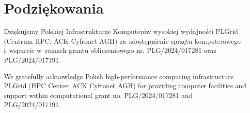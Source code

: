\documentclass[data-science]{agh-wi} %
\begin{document}
\chapter{Podziękowania}

Dziękujemy Polskiej Infrastrukturze Komputerów wysokiej wydajności PLGrid (Centrum HPC: ACK Cyfronet AGH) za udostępnienie sprzętu komputerowego i~wsparcie w~ramach grantu obliczeniowego nr. PLG/2024/017281 oraz PLG/2024/017191.
\vspace*{1.5cm}

We gratefully acknowledge Polish high-performance computing infrastructure PLGrid (HPC Center: ACK Cyfronet AGH) for providing computer facilities and support within computational grant no. PLG/2024/017281 and PLG/2024/017191.


\printbibliography
\end{document}
